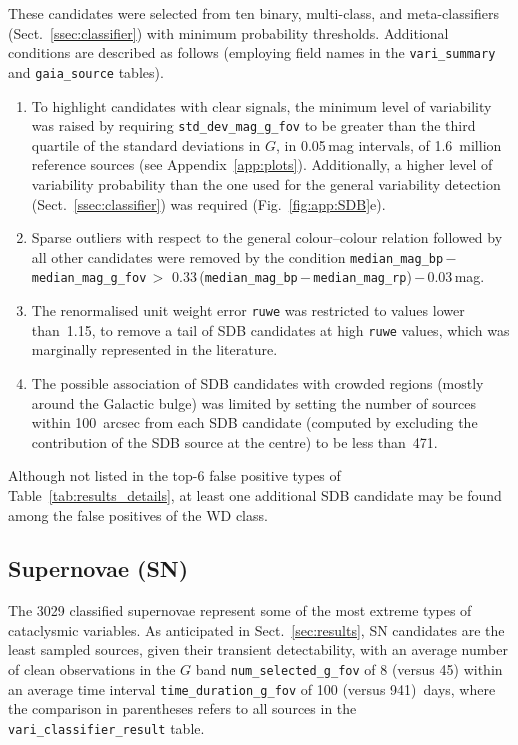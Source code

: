 \documentclass[longauth]{aa}
\def\g{$G$\xspace}
\begin{document}
These candidates were selected from ten binary, multi-class, and meta-classifiers (Sect.~\ref{ssec:classifier}) with minimum probability thresholds. 
Additional conditions are described as follows (employing field names in the \texttt{vari\_summary} and \texttt{gaia\_source} tables).
\begin{enumerate}
    \item To highlight candidates with clear signals, the minimum level of variability was raised by requiring \texttt{std\_dev\_mag\_g\_fov} to be greater than the third quartile of the standard deviations in \g, in 0.05\,mag intervals, of 1.6~million reference sources (see Appendix~\ref{app:plots}). Additionally, a higher level of variability probability than the one used for the general variability detection (Sect.~\ref{ssec:classifier}) was required (Fig.~\ref{fig:app:SDB}e).
    \item Sparse outliers with respect to the general colour--colour relation followed by all other candidates were removed by the condition \texttt{median\_mag\_bp}\,$-$\,\texttt{median\_mag\_g\_fov}\,$>$ 0.33\,(\texttt{median\_mag\_bp}\,$-$\,\texttt{median\_mag\_rp})\,$-$\,0.03\,mag.
    \item The renormalised unit weight error \texttt{ruwe} was restricted to values lower than~1.15, to remove a tail of SDB candidates at high \texttt{ruwe} values, which was marginally represented in the literature.
    \item  The possible association of SDB candidates with crowded regions (mostly around the Galactic bulge) was limited by setting the number of sources within 100~arcsec from each SDB candidate (computed by excluding the contribution of the SDB source at the centre) to be less than~471.  
\end{enumerate}

Although not listed in the top-6 false positive types of Table~\ref{tab:results_details}, at least one additional SDB candidate may be found among the false positives of the WD class.


\subsection{Supernovae (SN)\label{ssec:sn}}

The 3029 classified supernovae represent some of the most extreme types of cataclysmic variables.
As anticipated in Sect.~\ref{sec:results}, SN candidates are the least sampled sources, given their transient detectability, with an average number of clean observations in the \g band \texttt{num\_selected\_g\_fov} of 8 (versus 45) within an average time interval \texttt{time\_duration\_g\_fov} of 100 (versus 941)~days, where the comparison in parentheses refers to all sources in the \texttt{vari\_classifier\_result} table.
\end{document}
